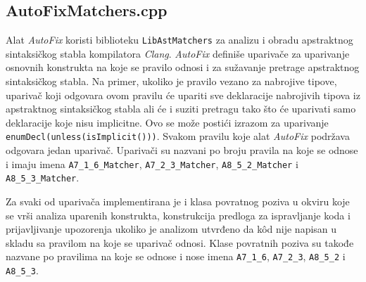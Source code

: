 \documentclass[12pt,oneside]{memoir}
\begin{document}
\subsection{AutoFixMatchers.cpp}
Alat \textit{AutoFix} koristi biblioteku \texttt{LibAstMatchers} za analizu i obradu apstraktnog sintaksi\v{c}kog stabla kompilatora \textit{Clang}. 
\textit{AutoFix} defini\v{s}e upariva\v{c}e za uparivanje osnovnih konstrukta na koje se pravilo odnosi i za su\v{z}avanje pretrage apstraktnog sintaksi\v{c}kog stabla. Na primer, ukoliko je pravilo vezano za nabrojive tipove, upariva\v{c} koji odgovara ovom pravilu \'{c}e upariti sve deklaracije nabrojivih tipova iz apstraktnog sintaksi\v{c}kog stabla ali \'{c}e i suziti pretragu tako \v{s}to \'{c}e uparivati samo deklaracije koje nisu implicitne. Ovo se mo\v{z}e posti\'{c}i izrazom za uparivanje \texttt{enumDecl(unless(isImplicit()))}. Svakom pravilu koje alat \textit{AutoFix} podr\v{z}ava odgovara jedan upariva\v{c}. Upariva\v{c}i su nazvani po broju pravila na koje se odnose i imaju imena
\texttt{A7\_1\_6\_Matcher}, \texttt{A7\_2\_3\_Matcher}, \texttt{A8\_5\_2\_Matcher} i \texttt{A8\_5\_3\_Matcher}.
\par
 Za svaki od upariva\v{c}a implementirana je i klasa povratnog poziva u okviru koje se vr\v{s}i analiza uparenih konstrukta, konstrukcija predloga za ispravljanje koda i prijavljivanje upozorenja ukoliko je analizom utvrđeno da k\^{o}d nije napisan u skladu sa pravilom na koje se upariva\v{c} odnosi. Klase
 povratnih poziva su takođe nazvane po pravilima na koje se odnose i nose imena \texttt{A7\_1\_6}, \texttt{A7\_2\_3}, \texttt{A8\_5\_2} i \texttt{A8\_5\_3}.
\end{document}
